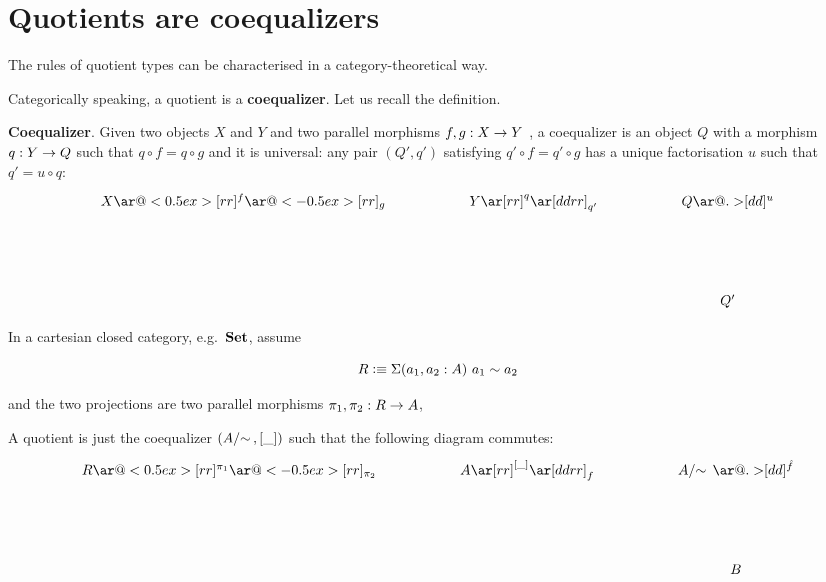 





\section{Quotients are coequalizers}



The rules of quotient types can be characterised in a category-theoretical way.

Categorically speaking, a quotient is a \textbf{coequalizer}. Let us recall the definition.


\begin{definition}
\textbf{Coequalizer}.
Given two objects $X$ and $Y$ and two parallel morphisms $f, g : X \rightarrow Y$ , a coequalizer is an object $Q$ with a morphism $q : Y \rightarrow Q$ such that $q \circ f = q \circ g$ and it is universal: any pair $(Q' , q')$ satisfying $q' \circ f = q' \circ g$ has a unique factorisation $u$ such that $q' = u \circ q$:
\begin{displaymath}
    \xymatrix{X \ar@<0.5ex>[rr]^f \ar@<-0.5ex>[rr]_g && Y \ar[rr]^q
      \ar[ddrr]_{q'} && Q
      \ar@{.>}[dd]^u \\ \\
& &&& Q' }
\end{displaymath}
\end{definition}


In a cartesian closed category, e.g.\ $\operatorname{\mathbf{Set}}$, assume

$$R \vcentcolon\equiv \Sigma (a_1,a_2 : A) ~ a_1 \sim a_2$$


and the two projections are two parallel morphisms $\pi_1,\pi_2 : R \rightarrow A$,

A quotient is just the coequalizer $(\qset{A},[\_])$ such that the following diagram commutes:
\begin{displaymath}
    \xymatrix{R \ar@<0.5ex>[rr]^{\pi_1} \ar@<-0.5ex>[rr]_{\pi_2} && A \ar[rr]^{ [\_]}
      \ar[ddrr]_{f} && \qset{A}
      \ar@{.>}[dd]^{\hat{f}} \\ \\
& &&& B}
\end{displaymath}

